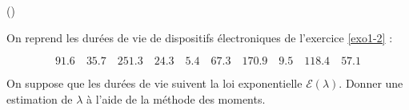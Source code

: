 \begin{exercice}\label{exo5-3} (\minsyndical)

On reprend les dur\'ees de vie de dispositifs \'electroniques de l'exercice
\ref{exo1-2} :

\[
91.6 \quad 35.7 \quad 251.3 \quad 24.3 \quad 5.4 \quad 67.3 \quad 170.9 \quad 9.5 
\quad 118.4 \quad 57.1
\]

On suppose que les dur\'ees de vie suivent la loi exponentielle $\mathcal{E} (\lambda)$.
Donner une estimation de $\lambda$ \`a l'aide de la m\'ethode des moments.\\


\end{exercice}
